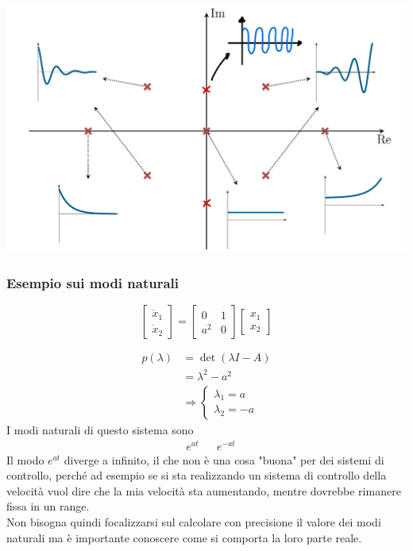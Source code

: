 \documentclass{article}
\begin{document}
\begin{center}
    \includegraphics[scale=0.23]{Images/Esempio_autovalori.png}
\end{center}

\subsubsection{Esempio sui modi naturali}
\[
    \begin{bmatrix}
        \dot x_1\\
        \dot x_2
    \end{bmatrix}
    =
    \begin{bmatrix}
        0 & 1\\
        a^2 & 0
    \end{bmatrix}
    \begin{bmatrix}
        x_1\\
        x_2
    \end{bmatrix}
\]

\begin{align*}
    p(\lambda) &= \det (\lambda I -A)\\
    &= \lambda^2 - a^2\\
    &\Rightarrow \begin{cases}
        \lambda_1 = a\\
        \lambda_2 = -a
    \end{cases}
\end{align*}
I modi naturali di questo sistema sono 
\begin{align*}
    &e^{at} & &e^{-at}
\end{align*}
Il modo $e^{at}$ diverge a infinito, il che non è una cosa "buona" per dei sistemi di controllo, perché ad esempio se si sta realizzando un sistema di controllo della velocità vuol dire che la mia velocità sta aumentando, mentre dovrebbe rimanere fissa in un range.\\
Non bisogna quindi focalizzarsi sul calcolare con precisione il valore dei modi naturali ma è importante conoscere come si comporta la loro parte reale.
\end{document}
